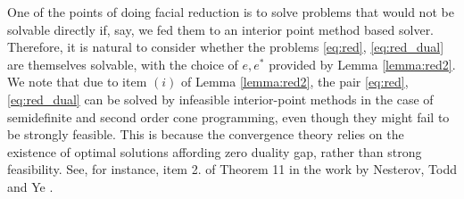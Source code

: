 \documentclass{article}
\newcommand{\reInt}{\mathrm{ri}\,}
\newcommand{\stdCone}{ {\mathcal{K}}}
\newcommand{\stdSpace}{ \mathcal{L}}
\newcommand{\stdInt}{ {e}}
\renewcommand{\Re}{\mathbb{R}}
\begin{document}
One of the points of doing facial reduction is to solve problems that  would not be 
solvable directly if, say, we fed them to an interior point method based solver. 
Therefore, it is natural to consider whether the problems \eqref{eq:red}, 
\eqref{eq:red_dual} are themselves solvable, with the choice of $\stdInt,\stdInt^*$ provided 
by Lemma \ref{lemma:red2}.
We note that due to item $(i)$ of Lemma \ref{lemma:red2}, 
the pair \eqref{eq:red}, \eqref{eq:red_dual} can be solved by infeasible interior-point 
methods in the case of semidefinite and second order cone programming, even though 
they might fail to be strongly feasible.
This is because the convergence theory relies on the existence of optimal solutions 
affording zero duality gap, rather than strong feasibility. See, for instance, 
item 2. of Theorem 11 in the work by Nesterov, Todd and Ye \cite{nesterov_infeasible}.

%
\end{document}
